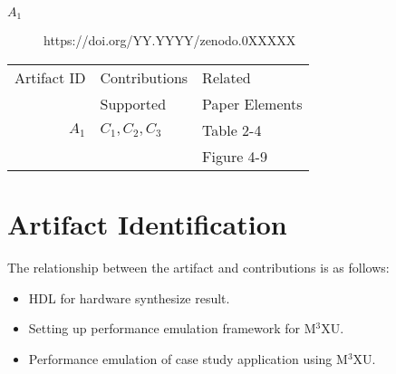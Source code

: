 \documentclass[conference]{IEEEtran}
\newcommand{\MPCMXU}[1]{M$^{3}$XU}
\begin{document}
\begin{description}
\item[$A_1$] https://doi.org/YY.YYYY/zenodo.0XXXXX
\end{description}


\begin{center}
\begin{tabular}{rll}
\toprule
Artifact ID  &  Contributions &  Related \\
             &  Supported     &  Paper Elements \\
\midrule
$A_1$   &  $C_1,C_2,C_3$ & Table 2-4 \\
        &          & Figure 4-9\\
\bottomrule
\end{tabular}
\end{center}

\section{Artifact Identification}


\newartifact

\artrel
The relationship between the artifact and contributions is as follows:
\begin{itemize}
    \item HDL for hardware synthesize result.
    \item Setting up performance emulation framework for \MPCMXU{}.
    \item Performance emulation of case study application using \MPCMXU{}.
\end{itemize}
\end{document}

